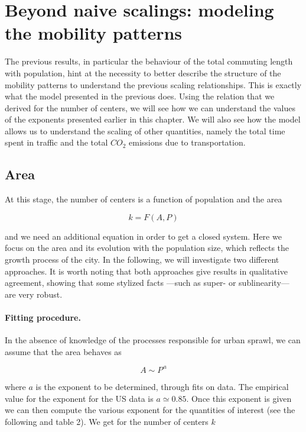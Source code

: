 \section{Beyond naive scalings: modeling the mobility patterns}

The previous results, in particular the behaviour of the total commuting length
with population, hint at the necessity to better describe the structure of the
mobility patterns to understand the previous scaling relationships. This is
exactly what the model presented in the previous does.
Using the relation that we derived for the number of centers, we will see how we
can understand the values of the exponents presented earlier in this chapter. We
will also see how the model allows us to understand the scaling of other
quantities, namely the total time spent in traffic and the total $CO_2$
emissions due to transportation.

\subsection{Area}

At this stage, the number of centers is a function of population and the area

\begin{equation}
    k = F\left(A,P\right)
\end{equation}

and we need an additional equation in order to get a closed system. Here we
focus on the area and its evolution with the population size, which reflects the
growth process of the city. In the following, we will investigate two different
approaches. It is worth noting that both approaches give results in qualitative
agreement, showing that some stylized facts ---such as super- or sublinearity---
are very robust.\\ 

\paragraph{Fitting procedure.}

In the absence of knowledge of the processes responsible for urban sprawl, we
can assume that the area behaves as 

\begin{equation}
    A \sim P^{\,a}
    \label{eq:fit}
\end{equation}

where $a$ is the exponent to be determined, through fits on data. The empirical
value for the exponent for the US data is $a\simeq 0.85$. Once this exponent is
given we can then compute the various exponent for the quantities of interest
(see the following and table 2). We get for the number of centers $k$

